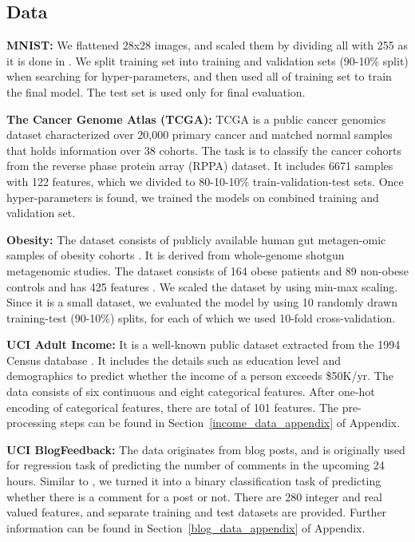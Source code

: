 \subsection{Data}\label{data_details}
\textbf{MNIST:}
We flattened 28x28 images, and scaled them by dividing all with 255 as it is done in \citep{yoon2020vime}. We split training set into training and validation sets (90-10\% split) when searching for hyper-parameters, and then used all of training set to train the final model. The test set is used only for final evaluation. 

\textbf{The Cancer Genome Atlas (TCGA):} TCGA is a public cancer genomics dataset characterized over 20,000 primary cancer and matched normal samples that holds information over 38 cohorts.  The task is to classify the cancer cohorts from the reverse phase protein array (RPPA) dataset. It includes 6671 samples with 122 features, which we divided to 80-10-10\% train-validation-test sets. Once hyper-parameters is found, we trained the models on combined training and validation set.

\textbf{Obesity:}
The dataset consists of publicly available human gut metagen-omic samples of obesity cohorts \citep{oh2020deepmicro}. It is derived from whole-genome shotgun metagenomic studies. The dataset consists of 164 obese patients and 89 non-obese controls and has 425 features \citep{le2013richness}. We scaled the dataset by using min-max scaling. Since it is a small dataset, we evaluated the model by using 10 randomly drawn training-test (90-10\%) splits, for each of which we used 10-fold cross-validation.

\textbf{UCI Adult Income:} It is a well-known public dataset extracted from the 1994 Census database \citep{kohavi1996scaling}. It includes the details such as education level and demographics to predict whether the income of a person exceeds \$50K/yr. The data consists of six continuous and eight categorical features. After one-hot encoding of categorical features, there are total of 101 features. The pre-processing steps can be found in Section~\ref{income_data_appendix} of Appendix.

\textbf{UCI BlogFeedback:} The data originates from blog posts, and is originally used for regression task of predicting the number of comments in the upcoming 24 hours. Similar to \citet{yoon2020vime}, we turned it into a binary classification task of predicting whether there is a comment for a post or not. There are 280 integer and real valued features, and separate training and test datasets are provided. Further information can be found in Section~\ref{blog_data_appendix} of Appendix.


